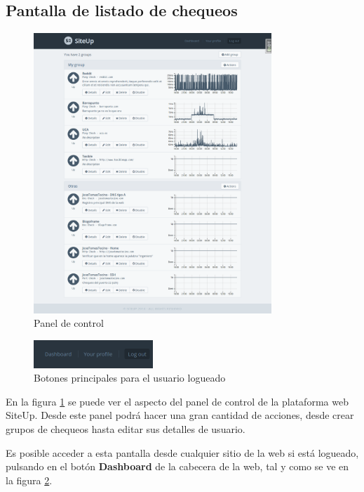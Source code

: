 \subsection{Pantalla de listado de chequeos}

\begin{figure}[hbtp]
  \centering
  \includegraphics[width=0.8\textwidth]{apendice_manual_usuario/pantalla-dashboard.png}
  \caption{Panel de control}
  \label{fig:dashboard}
\end{figure}

\begin{figure}[hbtp]
  \centering
  \includegraphics[width=0.4\textwidth]{apendice_manual_usuario/general_botones_2.png}
  \caption{Botones principales para el usuario logueado}
  \label{fig:botones-2}
\end{figure}

En la figura \ref{fig:dashboard} se puede ver el aspecto del panel de control de
la plataforma web SiteUp. Desde este panel podrá hacer una gran cantidad de
acciones, desde crear grupos de chequeos hasta editar sus detalles de usuario.

Es posible acceder a esta pantalla desde cualquier sitio de la web si está
logueado, pulsando en el botón \textbf{Dashboard} de la cabecera de la web, tal
y como se ve en la figura \ref{fig:botones-2}.

